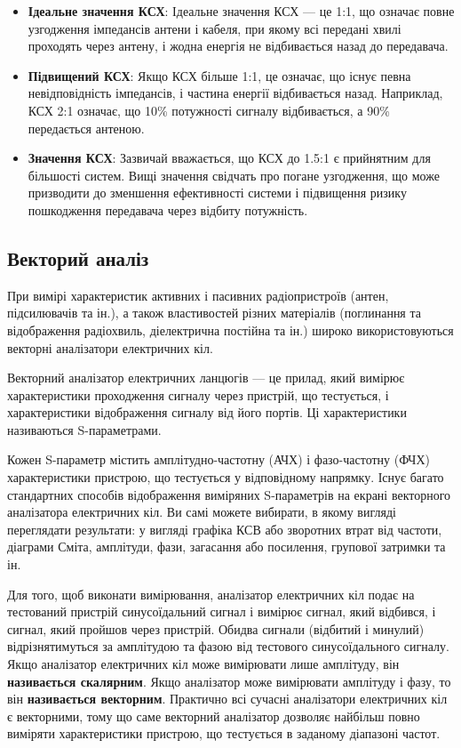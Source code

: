 \documentclass{article}
\begin{document}
\begin{itemize}[noitemsep, topsep=8pt]
\item \textbf{Ідеальне значення КСХ}: Ідеальне значення КСХ --- це 1:1, що означає повне узгодження імпедансів антени і кабеля, при якому всі передані хвилі проходять через антену, і жодна енергія не відбивається назад до передавача.
\item \textbf{Підвищений КСХ}: Якщо КСХ більше 1:1, це означає, що існує певна невідповідність імпедансів, і частина енергії відбивається назад. Наприклад, КСХ 2:1 означає, що 10\% потужності сигналу відбивається, а 90\% передається антеною.
\item \textbf{Значення КСХ}: Зазвичай вважається, що КСХ до 1.5:1 є прийнятним для більшості систем. Вищі значення свідчать про погане узгодження, що може призводити до зменшення ефективності системи і підвищення ризику пошкодження передавача через відбиту потужність.
\end{itemize}


\subsection{Векторий аналіз}

При вимірі характеристик активних і пасивних радіопристроїв (антен, підсилювачів та ін.), а також властивостей різних матеріалів (поглинання та відображення радіохвиль, діелектрична постійна та ін.) широко використовуються векторні аналізатори електричних кіл.

Векторний аналізатор електричних ланцюгів — це прилад, який вимірює характеристики проходження сигналу через пристрій, що тестується, і характеристики відображення сигналу від його портів. Ці характеристики називаються S-параметрами.

Кожен S-параметр містить амплітудно-частотну (АЧХ) і фазо-частотну (ФЧХ) характеристики пристрою, що тестується у відповідному напрямку. Існує багато стандартних способів відображення виміряних S-параметрів на екрані векторного аналізатора електричних кіл. Ви самі можете вибирати, в якому вигляді переглядати результати: у вигляді графіка КСВ або зворотних втрат від частоти, діаграми Сміта, амплітуди, фази, загасання або посилення, групової затримки та ін.


Для того, щоб виконати вимірювання, аналізатор електричних кіл подає на тестований пристрій синусоїдальний сигнал і вимірює сигнал, який відбився, і сигнал, який пройшов через пристрій. Обидва сигнали (відбитий і минулий) відрізнятимуться за амплітудою та фазою від тестового синусоїдального сигналу. Якщо аналізатор електричних кіл може вимірювати лише амплітуду, він \textbf{називається скалярним}. Якщо аналізатор може вимірювати амплітуду і фазу, то він \textbf{називається векторним}. Практично всі сучасні аналізатори електричних кіл є векторними, тому що саме векторний аналізатор дозволяє найбільш повно виміряти характеристики пристрою, що тестується в заданому діапазоні частот.
\end{document}
